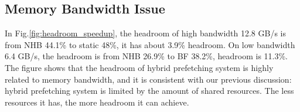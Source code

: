   \subsection{Memory Bandwidth Issue}

  \label{sec:memorybandwidhissue}
  In Fig.\ref{fig:headroom_speedup}, the headroom of high bandwidth 12.8 GB/s is from NHB 44.1\% to static 48\%, it has about 3.9\% headroom. On low bandwidth 6.4 GB/s, the headroom is from NHB 26.9\% to BF 38.2\%, headroom is 11.3\%.
  The figure shows that the headroom of hybrid prefetching system is highly related to memory bandwidth, and it is consistent with our previous discussion: hybrid prefetching system is limited by the amount of shared resources.
  The less resources it has, the more headroom it can achieve.\par


